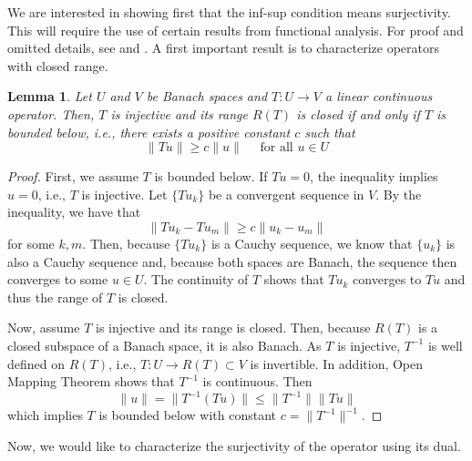 \documentclass{article}
\newtheorem{lemma}{Lemma}
\begin{document}
We are interested in showing first that the inf-sup condition means 
surjectivity. This will require the use of certain results from 
functional analysis. For proof and omitted details, see \cite{chen2024infSup} 
and \cite{gatica2014simple}. A first important result is to characterize 
operators with closed range. 

\begin{lemma}
    Let \(U\) and \( V\) be Banach spaces and \(T:U\to V\) a linear 
    continuous operator. Then, \(T\) is injective and its range \(R(T)\) is 
    closed if and only if  \(T\) is bounded below, i.e., there exists 
    a positive constant \(c\) such that 
    \begin{displaymath}
        \lVert Tu \rVert \ge c\lVert u \rVert
        \quad \text{ for all } u\in U
    \end{displaymath}
\end{lemma}
\begin{proof}
    First, we assume \(T\) is bounded below. If \(Tu=0\), the inequality 
    implies \(u=0\), i.e., \(T\) is injective. Let \(\{Tu_k\}\) be a convergent 
    sequence in \(V\). By the inequality, we have that
    \begin{displaymath}
        \lVert Tu_k - Tu_m \rVert \ge c\lVert u_k - u_m \rVert
    \end{displaymath}
    for some \(k,m\). Then, because \(\{Tu_k\}\) is a Cauchy sequence, we 
    know that \(\{u_k\}\) is also a Cauchy sequence and, because both spaces 
    are Banach, the sequence then converges to some \(u\in U\). The continuity 
    of \(T\) shows that \(Tu_k\) converges to \(Tu\) and thus the range of 
    \(T\) is closed. 

    Now, assume \(T\) is injective and its range is closed. Then, because 
    \(R(T)\) is a closed subspace of a Banach space, it is also Banach. As 
    \( T\) is injective, \(T^{-1}\) is well defined on \(R(T)\), i.e., 
    \(T:U\to R(T)\subset V\) is invertible. In addition, Open Mapping Theorem 
    shows that \(T^{-1}\) is continuous. Then
    \begin{displaymath}
        \lVert u \rVert = \lVert T^{-1}(Tu) \rVert 
        \le \lVert T^{-1} \rVert \lVert Tu \rVert 
    \end{displaymath}
    which implies \(T\) is bounded below with constant 
    \(c = \lVert T^{-1} \rVert^{-1}\).
\end{proof}

Now, we would like to characterize the surjectivity of the operator using its dual.
\end{document}
